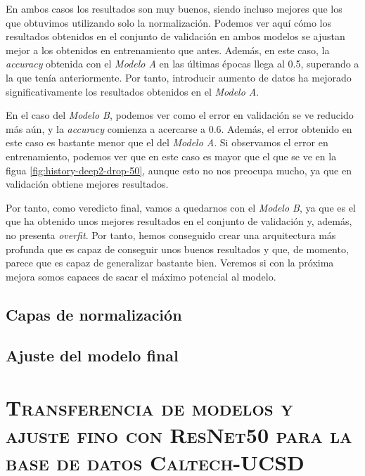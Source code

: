 \documentclass[11pt,a4paper]{article}
\begin{document}
En ambos casos los resultados son muy buenos, siendo incluso mejores que los que obtuvimos utilizando solo la normalización. Podemos ver aquí cómo
los resultados obtenidos en el conjunto de validación en ambos modelos se ajustan mejor a los obtenidos en entrenamiento que antes. Además,
en este caso, la \textit{accuracy} obtenida con el \textit{Modelo A} en las últimas épocas llega al 0.5, superando a la que tenía anteriormente.
Por tanto, introducir aumento de datos ha mejorado significativamente los resultados obtenidos en el \textit{Modelo A}.

En el caso del \textit{Modelo B}, podemos ver como el error en validación se ve reducido más aún, y la \textit{accuracy} comienza a acercarse
a 0.6. Además, el error obtenido en este caso es bastante menor que el del \textit{Modelo A}. Si observamos el error en entrenamiento,
podemos ver que en este caso es mayor que el que se ve en la figua \ref{fig:history-deep2-drop-50}, aunque esto no nos preocupa mucho, ya que
en validación obtiene mejores resultados.

Por tanto, como veredicto final, vamos a quedarnos con el \textit{Modelo B}, ya que es el que ha obtenido unos mejores resultados en el conjunto
de validación y, además, no presenta \textit{overfit}. Por tanto, hemos conseguido crear una arquitectura más profunda que es capaz de conseguir
unos buenos resultados y que, de momento, parece que es capaz de generalizar bastante bien. Veremos si con la próxima mejora somos capaces
de sacar el máximo potencial al modelo.

\subsection{Capas de normalización}

\subsection{Ajuste del modelo final}

\section{\textsc{Transferencia de modelos y ajuste fino con ResNet50 para la base de datos Caltech-UCSD}}

\newpage



\end{document}
